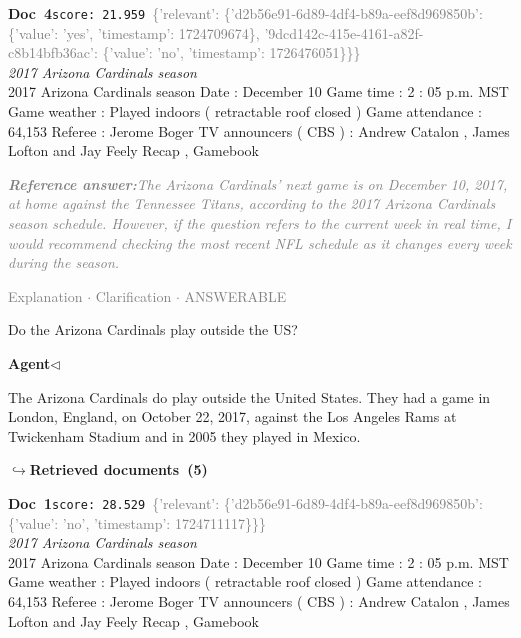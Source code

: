 \documentclass[a4paper,11pt]{article}
\begin{document}
\begin{docenv}
{\footnotesize\textcolor{doccolor}{\textbf{Doc~4}}}\hfill{\tiny\texttt{score:~21.959}}\ {\tiny\textcolor{gray}{\{'relevant': \{'d2b56e91-6d89-4df4-b89a-eef8d969850b': \{'value': 'yes', 'timestamp': 1724709674\}, '9dcd142c-415e-4161-a82f-c8b14bfb36ac': \{'value': 'no', 'timestamp': 1726476051\}\}\}}}\\[3pt]
{\small\textit{2017 Arizona Cardinals season}}\\[2pt]
\vspace{2pt}
{\footnotesize 2017 Arizona Cardinals season
Date : December 10 Game time : 2 : 05 p.m. MST Game weather : Played indoors ( retractable roof closed ) Game attendance : 64,153 Referee : Jerome Boger TV announcers ( CBS ) : Andrew Catalon , James Lofton and Jay Feely Recap , Gamebook}
\end{docenv}
\begin{refanswerenv}
{\footnotesize\textit{\textcolor{gray}{\textbf{Reference answer:}\enspace The Arizona Cardinals' next game is on December 10, 2017, at home against the Tennessee Titans, according to the 2017 Arizona Cardinals season schedule. However, if the question refers to the current week in real time, I would recommend checking the most recent NFL schedule as it changes every week during the season.}}}
\end{refanswerenv}
\vspace{0.5em}
\hfill{\tiny\textcolor{gray}{Explanation $\cdot$ Clarification $\cdot$ ANSWERABLE}}
\begin{userbubble}
Do the Arizona Cardinals play outside the US?
\end{userbubble}
\noindent\hfill{\small\textcolor{agentcolor}{\textbf{Agent\enspace$\triangleleft$}}}
\begin{agentbubble}
The Arizona Cardinals do play outside the United States. They had a game in London, England, on October 22, 2017, against the Los Angeles Rams at Twickenham Stadium and in 2005 they played in Mexico.
\end{agentbubble}
\noindent\hfill{\footnotesize\textcolor{doccolor}{\textbf{$\hookrightarrow$\enspace Retrieved documents~(5)}}}
\begin{docenv}
{\footnotesize\textcolor{doccolor}{\textbf{Doc~1}}}\hfill{\tiny\texttt{score:~28.529}}\ {\tiny\textcolor{gray}{\{'relevant': \{'d2b56e91-6d89-4df4-b89a-eef8d969850b': \{'value': 'no', 'timestamp': 1724711117\}\}\}}}\\[3pt]
{\small\textit{2017 Arizona Cardinals season}}\\[2pt]
\vspace{2pt}
{\footnotesize 2017 Arizona Cardinals season
Date : December 10 Game time : 2 : 05 p.m. MST Game weather : Played indoors ( retractable roof closed ) Game attendance : 64,153 Referee : Jerome Boger TV announcers ( CBS ) : Andrew Catalon , James Lofton and Jay Feely Recap , Gamebook}
\end{docenv}
\end{document}
